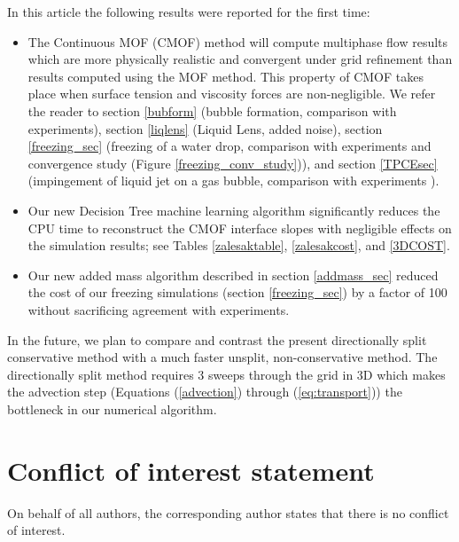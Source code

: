 \documentclass[]{article}
\begin{document}
In this article the following results were reported for the
first time:
\begin{itemize}
	\item The Continuous MOF (CMOF) method will compute multiphase
		flow results which are more physically realistic and
		convergent under grid refinement than results computed
		using the MOF method.  This property of CMOF takes place
		when surface tension and viscosity forces are non-negligible.
		We refer the reader to section \ref{bubform} 
		(bubble formation, comparison with 
		experiments\cite{helsby1955behaviour}),
		section \ref{liqlens} (Liquid Lens, added noise),
		section \ref{freezing_sec}
		(freezing of a water drop, comparison with 
		experiments\cite{hu2010icing} and convergence study
		(Figure \ref{freezing_conv_study})), and
		section \ref{TPCEsec} (impingement of liquid jet on a
		gas bubble, comparison with experiments 
		\cite{bentz1992jet}).
	\item Our new Decision Tree machine learning algorithm 
		significantly reduces the CPU time to reconstruct
		the CMOF interface slopes with negligible
		effects on the simulation results; see Tables
		\ref{zalesaktable}, \ref{zalesakcost}, and
		\ref{3DCOST}.
	\item Our new added mass algorithm described in 
		section \ref{addmass_sec} reduced the cost of 
		our freezing simulations 
		(section \ref{freezing_sec}) by a factor of 100 without
		sacrificing agreement with experiments.
\end{itemize}

In the future, we plan to compare and contrast the present directionally split
conservative method with a much faster unsplit, non-conservative method.
The directionally split method requires 3 sweeps through the grid in 3D which
makes the advection step (Equations (\ref{advection}) through
(\ref{eq:transport})) the bottleneck in our
numerical algorithm.

\section{Conflict of interest statement }

On behalf of all authors, the corresponding author states that there is no conflict of interest.


\end{document}
